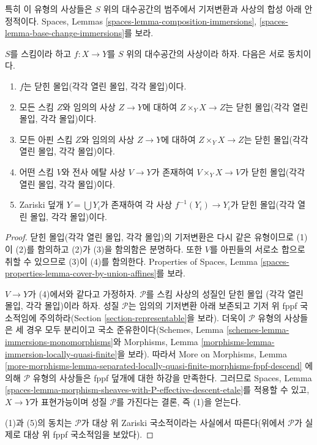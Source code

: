 \medskip\noindent
특히 이 유형의 사상들은 $S$ 위의 대수공간의 범주에서 기저변환과
사상의 합성 아래 안정적이다. Spaces, Lemmas
\ref{spaces-lemma-composition-immersions},
\ref{spaces-lemma-base-change-immersions}를 보라.

\begin{lemma}
\label{lemma-closed-immersion-local}
$S$를 스킴이라 하고 $f : X \to Y$를 $S$ 위의 대수공간의 사상이라 하자.
다음은 서로 동치이다.
\begin{enumerate}
\item $f$는 닫힌 몰입(각각 열린 몰입, 각각 몰입)이다.
\item 모든 스킴 $Z$와 임의의 사상 $Z \to Y$에 대하여
$Z \times_Y X \to Z$는 닫힌 몰입(각각 열린 몰입, 각각 몰입)이다.
\item 모든 아핀 스킴 $Z$와 임의의 사상 $Z \to Y$에 대하여
$Z \times_Y X \to Z$는 닫힌 몰입(각각 열린 몰입, 각각 몰입)이다.
\item 어떤 스킴 $V$와 전사 에탈 사상 $V \to Y$가 존재하여
$V \times_Y X \to V$가 닫힌 몰입(각각 열린 몰입, 각각 몰입)이다.
\item Zariski 덮개 $Y = \bigcup Y_i$가 존재하여 각 사상
$f^{-1}(Y_i) \to Y_i$가 닫힌 몰입(각각 열린 몰입, 각각 몰입)이다.
\end{enumerate}
\end{lemma}

\begin{proof}
닫힌 몰입(각각 열린 몰입, 각각 몰입)의 기저변환은 다시 같은 유형이므로
(1)이 (2)를 함의하고 (2)가 (3)을 함의함은 분명하다.
또한 $V$를 아핀들의 서로소 합으로 취할 수 있으므로 (3)이 (4)를
함의한다. Properties of Spaces, Lemma
\ref{spaces-properties-lemma-cover-by-union-affines}를 보라.

\medskip\noindent
$V \to Y$가 (4)에서와 같다고 가정하자.
$\mathcal{P}$를 스킴 사상의 성질인 닫힌 몰입
(각각 열린 몰입, 각각 몰입)이라 하자.
성질 $\mathcal{P}$는 임의의 기저변환 아래 보존되고 기저 위 fppf
국소적임에 주의하라(Section \ref{section-representable}을 보라).
더욱이 $\mathcal{P}$ 유형의 사상들은 세 경우 모두 분리이고
국소 준유한이다(Schemes, Lemma
\ref{schemes-lemma-immersions-monomorphisms}와 Morphisms, Lemma
\ref{morphisms-lemma-immersion-locally-quasi-finite}을 보라).
따라서 More on Morphisms, Lemma
\ref{more-morphisms-lemma-separated-locally-quasi-finite-morphisms-fppf-descend}
에 의해 $\mathcal{P}$ 유형의 사상들은 fppf 덮개에 대한 하강을
만족한다. 그러므로 Spaces, Lemma
\ref{spaces-lemma-morphism-sheaves-with-P-effective-descent-etale}를
적용할 수 있고, $X \to Y$가 표현가능이며 성질 $\mathcal{P}$를
가진다는 결론, 즉 (1)을 얻는다.

\medskip\noindent
(1)과 (5)의 동치는 $\mathcal{P}$가 대상 위 Zariski 국소적이라는
사실에서 따른다(위에서 $\mathcal{P}$가 실제로 대상 위 fppf
국소적임을 보았다).
\end{proof}

